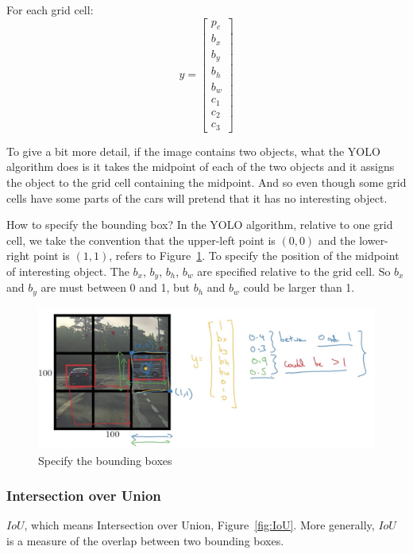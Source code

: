 \documentclass[UTF8]{article}
\newcommand{\Vector}[1]{\boldsymbol{\mathit{#1}}}   %
\begin{document}
For each grid cell:
$$ \Vector{y} = \left[\begin{array}{c} p_c \\ b_x \\ b_y \\ b_h \\ b_w \\ c_1 \\ c_2 \\ c_3
\end{array}\right] $$

To give a bit more detail, if the image contains two objects, what the YOLO algorithm does is it
takes the midpoint of each of the two objects and it assigns the object to the grid cell containing
the midpoint. And so even though some grid cells have some parts of the cars will pretend that it
has no interesting object.

How to specify the bounding box? In the YOLO algorithm, relative to one grid cell, we take the
convention that the upper-left point is $(0, 0)$ and the lower-right point is $(1, 1)$, refers to
Figure~\ref{fig:bounding-boxes}. To specify the position of the midpoint of interesting object. The
$b_x$, $b_y$, $b_h$, $b_w$ are specified relative to the grid cell. So $b_x$ and $b_y$ are must
between 0 and 1, but $b_h$ and $b_w$ could be larger than 1.

\begin{figure}[htb]
    \centering
    \includegraphics[width=40em]{figures/bounding-boxes}
    \caption{Specify the bounding boxes}
    \label{fig:bounding-boxes}
\end{figure}

\subsubsection{Intersection over Union}
$IoU$, which means Intersection over Union, Figure~\ref{fig:IoU}. More generally, $IoU$ is a
measure of the overlap between two bounding boxes.
\end{document}
